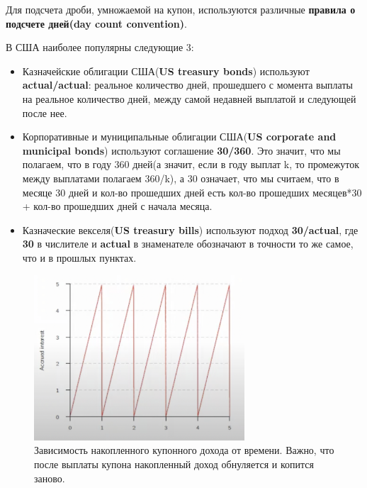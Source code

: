 \documentclass{article}
\begin{document}
 \vspace{10mm}
 
 Для подсчета дроби, умножаемой на купон, используются различные \textbf{правила о подсчете дней(day count convention)}.
 
 В США наиболее популярны следующие 3:
 \begin{itemize}
     \item Казначейские облигации США(\textbf{US treasury bonds}) используют \textbf{actual/actual}: реальное количество дней, прошедшего с момента выплаты на реальное количество дней, между самой недавней выплатой и следующей после нее.
     \item Корпоративные и муниципальные облигации США(\textbf{US corporate and municipal bonds}) используют соглашение \textbf{30/360}. Это значит, что мы полагаем, что в году 360 дней(а значит, если в году выплат k, то промежуток между выплатами полагаем 360/k), а 30 означает, что мы считаем, что в месяце 30 дней и кол-во прошедших дней есть кол-во прошедших месяцев*30 + кол-во прошедших дней с начала месяца.
     \item Казначеские векселя(\textbf{US treasury bills}) используют подход \textbf{30/actual}, где \textbf{30} в числителе и \textbf{actual} в знаменателе  обозначают в точности то же самое, что и в прошлых пунктах.
 \end{itemize}
 
\begin{figure}[h]
\centering
\includegraphics[width=0.7\textwidth]{accr_int.png}
\caption{Зависимость накопленного купонного дохода от времени. Важно, что после выплаты купона накопленный доход обнуляется и копится заново.}
\label{loadings}
\end{figure}
\end{document}
